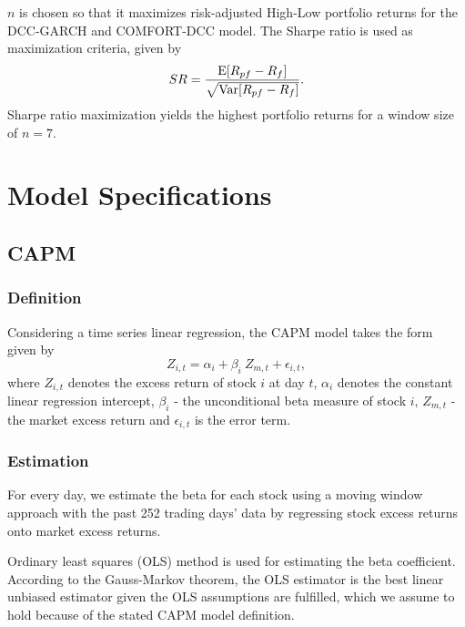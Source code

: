 \documentclass[11pt,a4paper]{article}
\begin{document}
$n$ is chosen so that it maximizes risk-adjusted High-Low portfolio returns for the DCC-GARCH and COMFORT-DCC model. The Sharpe ratio is used as maximization criteria, given by
\begin{equation}
	SR = \dfrac{\textrm{E}[R_{pf} - R_f]}{\sqrt{\textrm{Var}[R_{pf} - R_f]}}.
\end{equation}
Sharpe ratio maximization yields the highest portfolio returns for a window size of $n=7$.

\newpage
\section{Model Specifications}


\subsection{CAPM}

\subsubsection{Definition}

Considering a time series linear regression, the CAPM model takes the form given by
\begin{equation}
Z_{i,t} = \alpha_i + \beta_i\ Z_{m,t} + \epsilon_{i,t},
\end{equation}
where $Z_{i,t}$ denotes the excess return of stock $i$ at day $t$, $\alpha_i$ denotes the constant linear regression intercept, $\beta_i$ - the unconditional beta measure of stock $i$, $Z_{m,t}$ - the market excess return and $\epsilon_{i,t}$ is the error term.


\subsubsection{Estimation}

For every day, we estimate the beta for each stock using a moving window approach with the past 252 trading days' data by regressing stock excess returns onto market excess returns.

Ordinary least squares (OLS) method is used for estimating the beta coefficient. According to the Gauss-Markov theorem, the OLS estimator is the best linear unbiased estimator given the OLS assumptions are fulfilled, which we assume to hold because of the stated CAPM model definition.
\end{document}
